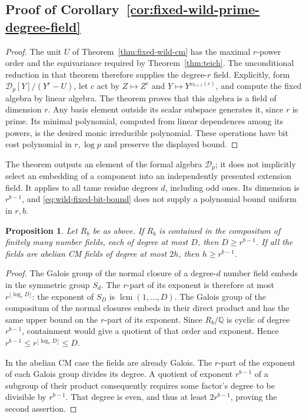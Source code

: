 \documentclass[11pt]{article}
\newtheorem{proposition}[theorem]{Proposition}
\theoremstyle{definition}
\theoremstyle{remark}
\begin{document}
\subsection*{Proof of Corollary~\ref{cor:fixed-wild-prime-degree-field}}
\begin{proof}
The unit \(U\) of Theorem~\ref{thm:fixed-wild-cm} has the
maximal \(r\)-power order and the equivariance required by
Theorem~\ref{thm:teich}. The unconditional reduction in that
theorem therefore supplies the degree-\(r\) field. Explicitly, form
\(\mathcal D_p[Y]/(Y^r-U)\), let \(c\) act by
\(Z\mapsto Z^c\) and \(Y\mapsto Y^{\omega_{b+1}(c)}\),
and compute the fixed algebra by linear algebra. The theorem
proves that this algebra is a field of dimension \(r\).
Any basis element outside its scalar subspace generates it,
since \(r\) is prime. Its minimal polynomial, computed from
linear dependences among its powers, is the desired monic
irreducible polynomial. These operations have bit cost
polynomial in \(r,\log p\) and preserve the displayed bound.
\end{proof}

The theorem outputs an element of the formal algebra
\(\mathcal D_p\); it does not implicitly select an embedding of
a component into an independently presented extension field.
It applies to all tame residue degrees \(d\), including odd
ones. Its dimension is \(r^{b-1}\), and \eqref{eq:wild-fixed-bit-bound} does not supply a
polynomial bound uniform in \(r,b\).

\begin{proposition}\label{prop:bounded-degree-wild-containment}
Let \(R_b\) be as above. If \(R_b\) is contained in the
compositum of finitely many number fields, each of degree at
most \(D\), then \(D\geq r^{b-1}\).
If all the fields are abelian CM fields of degree at most
\(2h\), then \(h\geq r^{b-1}\).
\end{proposition}
\begin{proof}
The Galois group of the normal closure of a degree-\(d\)
number field embeds in the symmetric group \(S_d\).
The \(r\)-part of its exponent is therefore at most
\(r^{\lfloor\log_rD\rfloor}\): the exponent of \(S_D\)
is \(\operatorname{lcm}(1,\ldots,D)\).
The Galois group of the compositum of the normal closures
embeds in their direct product and has the same upper bound
on the \(r\)-part of its exponent. Since \(R_b/\mathbb Q\)
is cyclic of degree \(r^{b-1}\), containment would give a
quotient of that order and exponent. Hence
\(r^{b-1}\leq r^{\lfloor\log_rD\rfloor}\leq D\).

In the abelian CM case the fields are already Galois. The
\(r\)-part of the exponent of each Galois group divides its
degree. A quotient of exponent \(r^{b-1}\) of a subgroup of
their product consequently requires some factor's degree to
be divisible by \(r^{b-1}\). That degree is even, and thus
at least \(2r^{b-1}\), proving the second assertion.
\end{proof}
\end{document}
